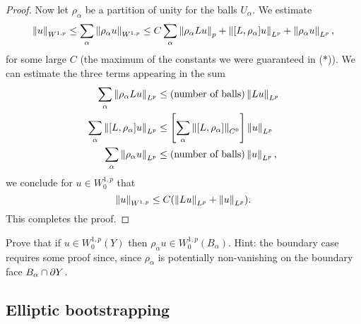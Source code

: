 \begin{proof}
  Now let $\rho_{\alpha}$ be a partition of unity for the balls
  $U_{\alpha}$. We estimate
  \begin{equation*}
    \left\lVert u\right\rVert_{W^{1,p}}\le
    \sum_{\alpha}\left\lVert\rho_{\alpha}u\right\rVert_{W^{1,p}}\le C\sum_{\alpha} \left\lVert\rho_{\alpha}Lu\right\rVert_{p}+\left\lVert[L,\rho_{\alpha}]u\right\rVert_{L^{p}}+\left\lVert\rho_{\alpha}u\right\rVert_{L^{p}},
  \end{equation*}
  for some large $C$ (the maximum of the constants we were
  guaranteed in ($\ast$)). We can estimate the three terms appearing
  in the sum
  \begin{equation*}
    \begin{aligned}
      \sum_{\alpha}\left\lVert\rho_{\alpha}Lu\right\rVert_{L^{p}}&\le (\text{number of
        balls})\left\lVert Lu\right\rVert_{L^{p}}\\
      \sum_{\alpha}\left\lVert[L,\rho_{\alpha}]u\right\rVert_{L^{p}}&\le
      \left[\sum_{\alpha}\left\lVert[L,\rho_{\alpha}]\right\rVert_{C^{0}}\right]\left\lVert u\right\rVert_{L^{p}}\\
      \sum_{\alpha}\left\lVert\rho_{\alpha}u\right\rVert_{L^{p}}&\le (\text{number of
        balls})\left\lVert u\right\rVert_{L^{p}},
    \end{aligned}    
  \end{equation*}
  we conclude for $u\in W^{1,p}_{0}$ that
  \begin{equation*}
    \left\lVert u\right\rVert_{W^{1,p}}\le C(\left\lVert Lu\right\rVert_{L^{p}}+\left\lVert u\right\rVert_{L^{p}}).
  \end{equation*}
  This completes the proof.    
\end{proof}
\begin{xca}
  Prove that if $u\in W^{1,p}_{0}(Y)$ then
  $\rho_{\alpha}u\in W^{1,p}_{0}(B_{\alpha})$. Hint: the boundary case
  requires some proof since, since $\rho_{\alpha}$ is potentially
  non-vanishing on the boundary face $B_{\alpha}\cap \partial Y$.
\end{xca}

\subsection*{Elliptic bootstrapping}

